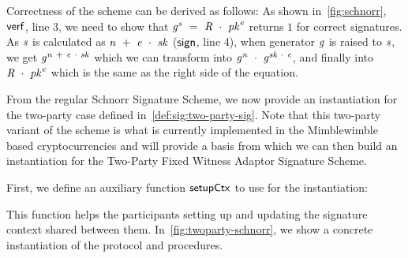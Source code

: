 Correctness of the scheme can be derived as follows:
As shown in~\cref{fig:schnorr}, $\mathsf{verf}$, line 3, we need to show that $\mathit{g}^{\mathit{s}} ~=~ \mathit{R} ~\cdot~ \mathit{pk}^{\mathit{e}}$ returns $1$ for correct signatures.
As $\mathit{s}$ is calculated as $\mathit{n} ~+~ \mathit{e} ~\cdot~ \mathit{sk}$ ($\mathsf{sign}$, line 4), when generator $\mathit{g}$ is raised to $\mathit{s}$, we get $\mathit{g}^{\mathit{n} ~+~ \mathit{e} ~\cdot~ \mathit{sk}}$ which we can transform into $\mathit{g}^{\mathit{n}} ~\cdot~ \mathit{g}^{\mathit{sk} ~\cdot~ \mathit{e}}$, and finally into $\mathit{R} ~\cdot~ \mathit{pk}^{\mathit{e}}$ which is the same as the right side of the equation.

From the regular Schnorr Signature Scheme, we now provide an instantiation for the two-party case defined in~\cref{def:sig:two-party-sig}.
Note that this two-party variant of the scheme is what is currently implemented in the Mimblewimble based cryptocurrencies and will provide a basis from which we can then build an instantiation for the Two-Party Fixed Witness Adaptor Signature Scheme.

First, we define an auxiliary function $\mathsf{setupCtx}$ to use for the instantiation:

\begin{center}
    \fbox{
    \begin{varwidth}{\textwidth}
        \procedure[linenumbering]{$\procSetupCtx{\varSigContext}{\varPubKeyAlice}{\varRandAlice}$} {
        \opAccess{\varSigContext}{\varPubKey} \opAssign \opAccess{\varSigContext}{\varPubKey} \opAddPoint \varPubKeyAlice \\
        \opAccess{\varSigContext}{\varRand} \opAssign \opAccess{\varSigContext}{\varRand} \opAddPoint \varRandAlice \\
        \pcreturn \varSigContext
        } \\
    \end{varwidth}
    }
\end{center}

This function helps the participants setting up and updating the signature context shared between them.
In~\cref{fig:twoparty-schnorr}, we show a concrete instantiation of the protocol and procedures.

